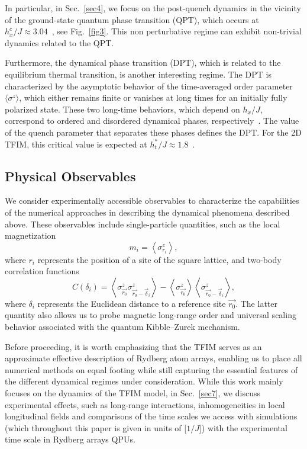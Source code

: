 \documentclass[aps,pra,reprint,amssymb,superscriptaddress]{revtex4-2}
\begin{document}
In particular, in Sec.~\ref{sec4}, we focus on the post-quench dynamics in the vicinity of the ground-state quantum phase transition (QPT), which occurs at $h_x^{c}/J \approx 3.04$~\cite{jordan_classical_2008}, see Fig.~\ref{fig3}. This non perturbative regime can exhibit non-trivial dynamics related to the QPT. 

Furthermore, the dynamical phase transition (DPT), which is related to the equilibrium thermal transition, is another interesting regime. The DPT is characterized by the asymptotic behavior of the time-averaged order parameter $\langle \sigma^z \rangle$, which either remains finite or vanishes at long times for an initially fully polarized state.
These two long-time behaviors, which depend on $h_x/J$, correspond to ordered and disordered dynamical phases, respectively~\cite{zunkovic_dynamical_2018,khasseh_discrete_2020}. The value of the quench parameter that separates these phases defines the DPT. For the 2D TFIM, this critical value is expected at $h_t^{*}/J \approx 1.8$~\cite{blas_test_2016,suzuki_quantum_1987, suzuki_quantum_2013}.


\subsection{Physical Observables}
\label{sec2.3}

We consider experimentally accessible observables to characterize the capabilities of the numerical approaches in describing the dynamical phenomena described above. These observables include single-particle quantities, such as the local magnetization
\begin{equation}
m_i =  \left< \sigma^z_{r_i} \right>,
\end{equation}
where ${r_i}$ represents the position of a site of the square lattice, and two-body correlation functions
\begin{equation}
    C(\delta_i) = \left< \sigma^z_{\vec{r_0}} \sigma^z_{\vec{r_0} -\vec{\delta}_i}\right> - \left< \sigma^z_{\vec{r_0}} \right> \left< \sigma^z_{\vec{r_0} -\vec{\delta}_i} \right>,
    \label{eq:corre}
 \end{equation}
where $\delta_i$ represents the Euclidean distance to a reference site $\vec{r_0}$.
The latter quantity also allows us to probe magnetic long-range order and universal scaling behavior associated with the quantum Kibble–Zurek mechanism.

Before proceeding, it is worth emphasizing that the TFIM serves as an approximate effective description of Rydberg atom arrays, enabling us to place all numerical methods on equal footing while still capturing the essential features of the different dynamical regimes under consideration. While this work mainly focuses on the dynamics of the TFIM model, in Sec.~\ref{sec7}, we discuss  experimental effects, such as long-range interactions, inhomogeneities in local longitudinal fields and comparisons of the time scales we access with simulations (which throughout this paper is given in units of [$1/J$]) with the experimental time scale in Rydberg arrays QPUs.  
\end{document}
